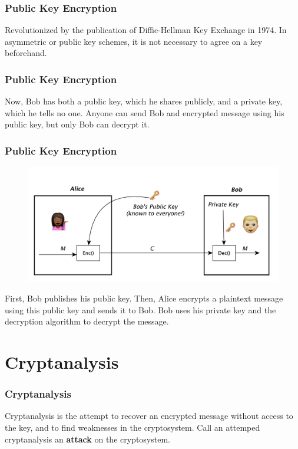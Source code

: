 \documentclass{beamer}
\newcommand{\<}{\langle}
\renewcommand{\>}{\rangle}
\begin{document}
\begin{frame}
\frametitle{Public Key Encryption}

Revolutionized by the publication of Diffie-Hellman Key Exchange in 1974. In asymmetric or public key schemes, it is not necessary to agree on a key beforehand. 
\end{frame}


\begin{frame}
\frametitle{Public Key Encryption}

Now, Bob has both a public key, which he shares publicly, and a private key, which he tells no one. Anyone can send Bob and encrypted message using his public key, but only Bob can decrypt it.
\end{frame}


\begin{frame}
\frametitle{Public Key Encryption}

\begin{figure}
\includegraphics[scale=.5]{IMG/diag10.pdf}
\end{figure}

First, Bob publishes his public key. Then, Alice encrypts a plaintext message using this public key and sends it to Bob. Bob uses his private key and the decryption algorithm to decrypt the message.
\end{frame}

\section{Cryptanalysis}

\begin{frame}
\frametitle{Cryptanalysis}

Cryptanalysis is the attempt to recover an encrypted message without access to the key, and to find weaknesses in the cryptosystem. Call an attemped cryptanalysis an \textbf{attack} on the cryptosystem. 
\end{frame}
\end{document}
